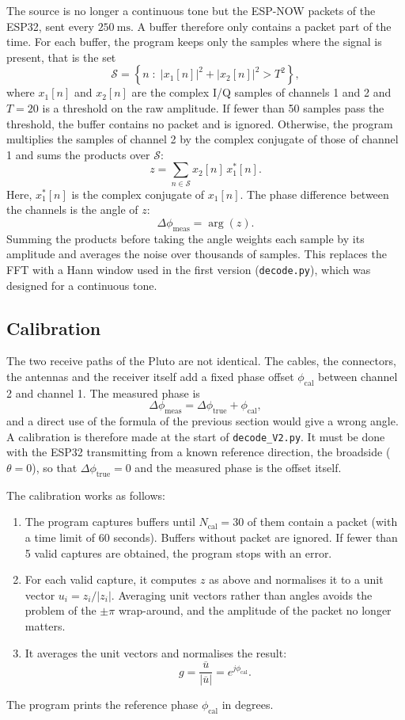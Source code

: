 The source is no longer a continuous tone but the ESP-NOW packets of the
ESP32, sent every \(250~\mathrm{ms}\). A buffer therefore only contains a
packet part of the time. For each buffer, the program keeps only the samples
where the signal is present, that is the set
\[
    \mathcal{S} = \left\{ n \;:\; |x_1[n]|^2 + |x_2[n]|^2 > T^2 \right\},
\]
where \(x_1[n]\) and \(x_2[n]\) are the complex I/Q samples of channels 1 and
2 and \(T = 20\) is a threshold on the raw amplitude. If fewer than 50 samples
pass the threshold, the buffer contains no packet and is ignored. Otherwise,
the program multiplies the samples of channel 2 by the complex conjugate of
those of channel 1 and sums the products over \(\mathcal{S}\):
\[
    z = \sum_{n\in\mathcal{S}} x_2[n]\,x_1^{*}[n].
\]
Here, \(x_1^{*}[n]\) is the complex conjugate of \(x_1[n]\). The phase
difference between the channels is the angle of \(z\):
\[
    \Delta\phi_{\mathrm{meas}} = \arg(z).
\]
Summing the products before taking the angle weights each sample by its
amplitude and averages the noise over thousands of samples. This replaces the
FFT with a Hann window used in the first version (\texttt{decode.py}), which
was designed for a continuous tone.

\subsection{Calibration}

The two receive paths of the Pluto are not identical. The cables, the
connectors, the antennas and the receiver itself add a fixed phase offset
\(\phi_{\mathrm{cal}}\) between channel 2 and channel 1. The measured phase is
\[
    \Delta\phi_{\mathrm{meas}} = \Delta\phi_{\mathrm{true}} + \phi_{\mathrm{cal}},
\]
and a direct use of the formula of the previous section would give a wrong
angle. A calibration is therefore made at the start of \texttt{decode\_V2.py}.
It must be done with the ESP32 transmitting from a known reference direction,
the broadside (\(\theta = 0\)), so that \(\Delta\phi_{\mathrm{true}} = 0\) and
the measured phase is the offset itself.

The calibration works as follows:
\begin{enumerate}
    \item The program captures buffers until \(N_{\mathrm{cal}} = 30\) of them
    contain a packet (with a time limit of 60 seconds). Buffers without packet
    are ignored. If fewer than 5 valid captures are obtained, the program stops
    with an error.
    \item For each valid capture, it computes \(z\) as above and normalises it
    to a unit vector \(u_i = z_i/|z_i|\). Averaging unit vectors rather than
    angles avoids the problem of the \(\pm\pi\) wrap-around, and the
    amplitude of the packet no longer matters.
    \item It averages the unit vectors and normalises the result:
    \[
        g = \frac{\overline{u}}{|\overline{u}|}
          = e^{j\phi_{\mathrm{cal}}}.
    \]
\end{enumerate}
The program prints the reference phase \(\phi_{\mathrm{cal}}\) in degrees.

